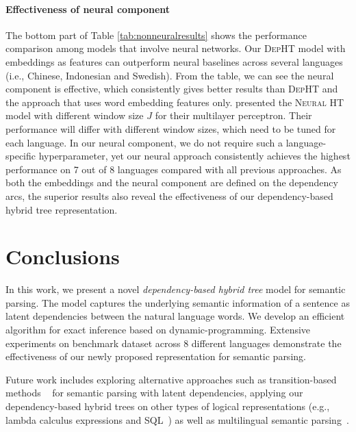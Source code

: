 \paragraph{Effectiveness of neural component}
The bottom part of Table \ref{tab:nonneuralresults} shows the performance comparison among models that involve neural networks.
Our \textsc{DepHT} model with embeddings as features can outperform neural baselines across several languages (i.e., Chinese, Indonesian and Swedish). 
From the table, we can see the neural component is effective, which consistently gives better results than \textsc{DepHT} and the approach that uses word embedding features only.
\citet{susanto2017semantic} presented the \textsc{Neural HT} model with different window size $J$ for their multilayer perceptron. Their performance will differ with different window sizes, which need to be tuned for each language. 
In our neural component, we do not require such a language-specific hyperparameter, yet our neural approach consistently achieves the highest performance on 7 out of 8 languages compared with all previous approaches.
% 
As both the embeddings and the neural component are defined on the dependency arcs, the superior results also reveal the effectiveness of our dependency-based hybrid tree representation. 



\section{Conclusions}

In this work, we present a novel {\em dependency-based hybrid tree} model for semantic parsing. 
The  model captures the underlying semantic information of a sentence as latent dependencies between the natural language words. 
We develop an efficient algorithm for exact inference  based on dynamic-programming.
Extensive experiments on benchmark dataset across 8 different languages demonstrate the effectiveness of our newly proposed representation for semantic parsing.

Future work includes exploring alternative approaches such as transition-based methods
~\cite{nivre2006maltparser,chen2014fast} for semantic parsing with latent dependencies, 
applying our dependency-based hybrid trees on other types of logical representations (e.g., lambda calculus expressions and SQL~\cite{P18-1033}) as well as multilingual semantic parsing~\cite{jie2014multilingual,susanto2017neural}.

